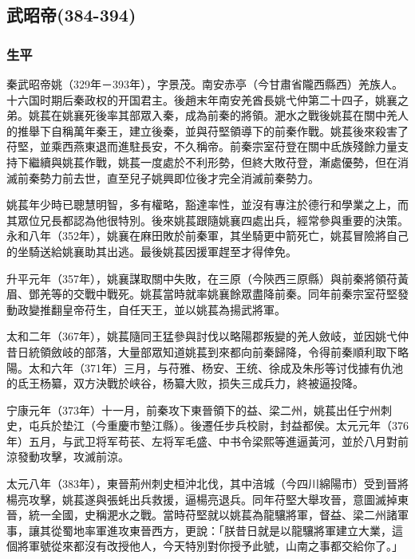 
\subsection{武昭帝\tiny(384-394)}

\subsubsection{生平}

秦武昭帝姚（329年－393年），字景茂。南安赤亭（今甘肅省隴西縣西）羌族人。十六国时期后秦政权的开国君主。後趙末年南安羌酋長姚弋仲第二十四子，姚襄之弟。姚萇在姚襄死後率其部眾入秦，成為前秦的將領。淝水之戰後姚萇在關中羌人的推舉下自稱萬年秦王，建立後秦，並與苻堅領導下的前秦作戰。姚萇後來殺害了苻堅，並乘西燕東退而進駐長安，不久稱帝。前秦宗室苻登在關中氐族殘餘力量支持下繼續與姚萇作戰，姚萇一度處於不利形勢，但終大敗苻登，漸處優勢，但在消滅前秦勢力前去世，直至兒子姚興即位後才完全消滅前秦勢力。

姚萇年少時已聰慧明智，多有權略，豁達率性，並沒有專注於德行和學業之上，而其眾位兄長都認為他很特別。後來姚萇跟隨姚襄四處出兵，經常參與重要的決策。永和八年（352年），姚襄在麻田敗於前秦軍，其坐騎更中箭死亡，姚萇冒險將自己的坐騎送給姚襄助其出逃。最後姚萇因援軍趕至才得倖免。

升平元年（357年），姚襄謀取關中失敗，在三原（今陝西三原縣）與前秦將領苻黃眉、鄧羌等的交戰中戰死。姚萇當時就率姚襄餘眾盡降前秦。同年前秦宗室苻堅發動政變推翻皇帝苻生，自任天王，並以姚萇為揚武將軍。

太和二年（367年），姚萇隨同王猛參與討伐以略陽郡叛變的羌人斂岐，並因姚弋仲昔日統領斂岐的部落，大量部眾知道姚萇到來都向前秦歸降，令得前秦順利取下略陽。太和六年（371年）三月，与苻雅、杨安、王统、徐成及朱彤等讨伐據有仇池的氐王杨纂，双方決戰於峡谷，杨纂大败，损失三成兵力，終被逼投降。

宁康元年（373年）十一月，前秦攻下東晉領下的益、梁二州，姚萇出任宁州刺史，屯兵於垫江（今重慶市墊江縣）。後遷任步兵校尉，封益都侯。太元元年（376年）五月，与武卫将军苟苌、左将军毛盛、中书令梁熙等進逼黃河，並於八月對前涼發動攻擊，攻滅前涼。

太元八年（383年），東晉荊州刺史桓沖北伐，其中涪城（今四川綿陽市）受到晉將楊亮攻擊，姚萇遂與張蚝出兵救援，逼楊亮退兵。同年苻堅大舉攻晉，意圖滅掉東晉，統一全國，史稱淝水之戰。當時苻堅就以姚萇為龍驤將軍，督益、梁二州諸軍事，讓其從蜀地率軍進攻東晉西方，更說：「朕昔日就是以龍驤將軍建立大業，這個將軍號從來都沒有改授他人，今天特別對你授予此號，山南之事都交給你了。」

